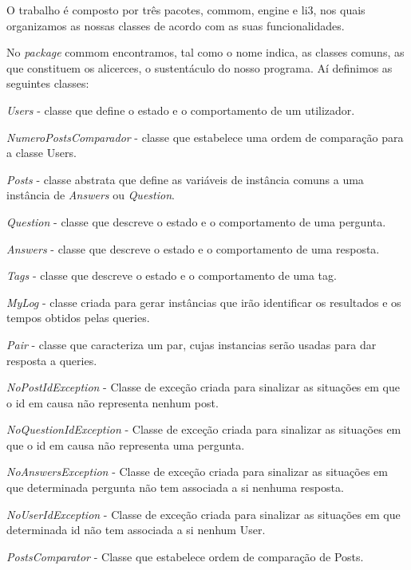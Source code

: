 \documentclass[a4paper]{article}
\begin{document}
O trabalho é composto por três pacotes, commom, engine e li3, nos quais organizamos
as nossas classes de acordo com as suas funcionalidades. \par
No \textit{package} commom
encontramos, tal como o nome indica, as classes comuns, as que constituem
os alicerces, o sustentáculo do nosso programa. Aí definimos as seguintes classes:
\begin{itemize}
\begin{item} \textit{Users} - classe que define o estado e o comportamento de um
 utilizador.\end{item}
\begin{item} \textit{NumeroPostsComparador} - classe que estabelece uma ordem de
comparação para a classe Users.\end{item}
\begin{item} \textit{Posts} - classe abstrata que define as variáveis de instância
comuns a uma instância de \textit{Answers} ou \textit{Question}.\end{item}
\begin{item} \textit{Question} - classe que descreve o estado e o comportamento de
uma pergunta.\end{item}
\begin{item} \textit{Answers} - classe que descreve o estado e o comportamento de
uma resposta.\end{item}
\begin{item} \textit{Tags} - classe que descreve o estado e o comportamento de
uma tag.\end{item}
\begin{item} \textit{MyLog} - classe criada para gerar instâncias que irão
identificar os resultados e os tempos obtidos pelas queries.\end{item}
\begin{item} \textit{Pair} - classe que caracteriza um par, cujas instancias
serão usadas para dar resposta a queries.\end{item}
\begin{item} \textit{NoPostIdException} - Classe de exceção criada para sinalizar
as situações em que o id em causa não representa nenhum post.\end{item}
\begin{item} \textit{NoQuestionIdException} - Classe de exceção criada para sinalizar
as situações em que o id em causa não representa uma pergunta.\end{item}
\begin{item} \textit{NoAnswersException} - Classe de exceção criada para sinalizar
as situações em que determinada pergunta não tem associada a si nenhuma resposta.\end{item}
\begin{item} \textit{NoUserIdException} - Classe de exceção criada para
    sinalizar as situações em que determinada id não tem associada a si
    nenhum User.
\end{item}
\begin{item} \textit{PostsComparator} - Classe que estabelece
    ordem de comparação de Posts.
\end{item}
\end{itemize}
\end{document}
